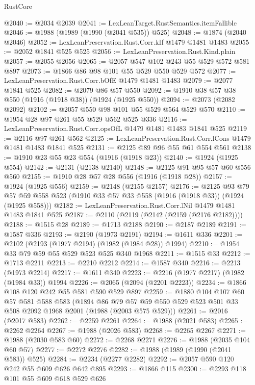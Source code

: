 \begin{lexlean}{RustCore}
\begin{coremodule}
@2040 := @2034 @2039
@2041 := LexLeanTarget.RustSemantics.itemFallible
@2046 := @1988 (@1989 (@1990 (@2041 @535)) @525)
@2048 := @1874 (@2040 @2046)
@2052 := LexLeanPreservation.Rust.Corr.kIf @1479 @1481 @1483
@2055 := @2052 @1841 @525 @525
@2056 := LexLeanPreservation.Rust.Kind.plain
@2057 := @2055 @2056
@2065 := @2057 @547 @102 @243 @55 @529 @572 @581 @897
@2073 := @1866 @86 @98 @101 @55 @529 @550 @529 @572
@2077 := LexLeanPreservation.Rust.Corr.bOfE @1479 @1481 @1483
@2079 := @2077 @1841 @525
@2082 := @2079 @86 @57 @550
@2092 := @1910 @38 @57 @38 @550 (@1916 (@1918 @38)) (@1924 (@1925 @550))
@2094 := @2073 (@2082 @2092)
@2102 := @2057 @550 @98 @101 @55 @529 @564 @529 @570
@2110 := @1954 @28 @97 @261 @55 @529 @562 @525 @336
@2116 := LexLeanPreservation.Rust.Corr.opsOfL @1479 @1481 @1483 @1841 @525
@2119 := @2116 @97 @261 @562
@2125 := LexLeanPreservation.Rust.Corr.lCons @1479 @1481 @1483 @1841 @525
@2131 := @2125 @89 @96 @55 @61 @554 @561
@2138 := @1910 @23 @55 @23 @554 (@1916 (@1918 @23))
@2140 := @1924 (@1925 @554)
@2142 := @2131 (@2138 @2140)
@2148 := @2125 @91 @95 @57 @60 @556 @560
@2155 := @1910 @28 @57 @28 @556 (@1916 (@1918 @28))
@2157 := @1924 (@1925 @556)
@2159 := @2148 (@2155 @2157)
@2176 := @2125
    @93
    @79
    @57
    @59
    @558
    @523
    (@1910 @33 @57 @33 @558 (@1916 (@1918 @33)) (@1924 (@1925 @558)))
@2182 := LexLeanPreservation.Rust.Corr.lNil @1479 @1481 @1483 @1841 @525
@2187 := @2110 (@2119 (@2142 (@2159 (@2176 @2182))))
@2188 := @1515 @28
@2189 := @1713 @2188
@2190 := @2187 @2189
@2191 := @1587 @336
@2193 := @2190 (@1973 @2191)
@2194 := @1611 @336
@2201 := @2102 (@2193 (@1977 @2194) (@1982 (@1984 @28)) @1994)
@2210 := @1954 @33 @79 @59 @55 @529 @523 @525 @340 @1968
@2211 := @1515 @33
@2212 := @1713 @2211
@2213 := @2210 @2212
@2214 := @1587 @340
@2216 := @2213 (@1973 @2214)
@2217 := @1611 @340
@2223 := @2216 (@1977 @2217) (@1982 (@1984 @33)) @1994
@2226 := @2065 (@2094 (@2201 @2223))
@2234 := @1866 @108 @120 @242 @55 @581 @590 @529 @897
@2259 := @1880
    @104
    @107
    @60
    @57
    @581
    @588
    @583
    (@1894 @86 @79 @57 @59 @550 @529 @523 @501 @33 @508 @2092 @1968 @2001 (@1988 (@2003 @575 @529)))
@2261 := @2016 (@2017 @583)
@2262 := @2259 @2261
@2264 := @1988 (@2021 @583)
@2265 := @2262 @2264
@2267 := @1988 (@2026 @583)
@2268 := @2265 @2267
@2271 := @1988 (@2030 @583 @60)
@2272 := @2268 @2271
@2276 := @1988 (@2035 @104 @60 @57)
@2277 := @2272 @2276
@2282 := @1988 (@1989 (@1990 (@2041 @583)) @525)
@2284 := @2234 (@2277 @2282)
@2292 := @2057 @590 @120 @242 @55 @609 @626 @642 @895
@2293 := @1866 @115
@2300 := @2293 @118 @101 @55 @609 @618 @529 @626

\end{coremodule}
\end{lexlean}
